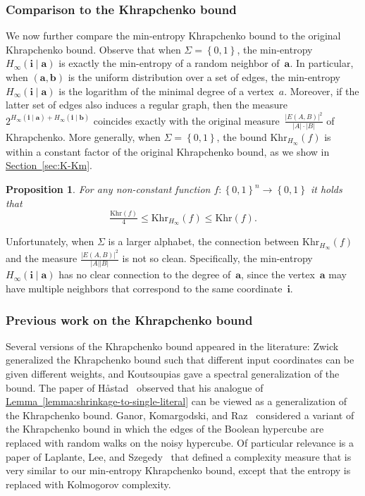 \documentclass[11pt]{article}
\numberwithin{equation}{section}
\newtheorem{proposition}[theorem]{Proposition}
\theoremstyle{definition}
\theoremstyle{plain}
\newcommand{\expref}[2]{\hyperref[#2]{#1~\ref{#2}}}
\theoremstyle{definition}\newtheorem{notation}[theorem]{Notation}\theoremstyle{plain}
\newcommand{\B}{\left\{ 0,1 \right \}}
\renewcommand{\a}{\boldsymbol{a}}
\renewcommand{\b}{\boldsymbol{b}}
\renewcommand{\i}{\boldsymbol{i}}
\newcommand{\Hm}{H_{\infty}}
\newcommand{\K}{\mathrm{Khr}}
\newcommand{\Km}{\K_{\Hm}}
\theoremstyle{definition}
\theoremstyle{plain}
\begin{document}
%
\subsubsection{Comparison to the Khrapchenko bound}  %

We now further compare the min-entropy 
Khrap\-chen\-ko %
bound to the original
Khrapchenko bound. Observe that when $\Sigma=\B$, the min-entropy
$\Hm(\i\mid\a)$ is exactly the min-entropy of a random neighbor of~$\a$.
In particular, when $(\a,\b)$ is the uniform distribution over a
set of edges, the min-entropy $\Hm(\i\mid\a)$ is the logarithm of
the minimal degree of a vertex~$a$. Moreover, if the latter set
of edges also induces a regular graph, then the measure $2^{\Hm(\i\mid\a)+\Hm(\i\mid\b)}$
coincides exactly with the original measure~$\frac{\left|E(A,B)\right|^{2}}{\left|A\right|\cdot\left|B\right|}$
of Khrapchenko. More generally, when $\Sigma=\B$, the bound $\Km(f)$
is within a constant factor of the original Khrapchenko bound, as
we show in \expref{Section}{sec:K-Km}. 
\begin{proposition}
\label{prop:K-Km}For any non-constant function $f\colon\B^{n}\to\B$ it
holds that 
\[
\tfrac{\K(f)}{4}\le\Km(f)\le\K(f).
\]
 
\end{proposition}

Unfortunately, when $\Sigma$ is a larger alphabet, the connection
between $\Km(f)$ and the measure $\frac{\left|E(A,B)\right|^{2}}{\left|A\right|\left|B\right|}$
is not so clean. Specifically, the min-entropy $\Hm(\i\mid\a)$ has
no clear connection to the degree of~$\a$, since the vertex~$\a$
may have multiple neighbors that correspond to the same coordinate~$\i$.

%
\subsubsection{Previous work on the Khrapchenko bound}  %

Several versions of the Khrapchenko bound appeared in the literature:
Zwick~\cite{Z91} generalized the Khrapchenko bound such that different
input coordinates can be given different weights, and Koutsoupias
\cite{K93} gave a spectral generalization of the bound. The paper
of H{\aa}stad~\cite{H98} observed that his analogue of 
\expref{Lemma}{lemma:shrinkage-to-single-literal}
can be viewed as a generalization of the Khrapchenko bound. Ganor,
Komargodski, and Raz~\cite{GKR12} considered a variant of the Khrapchenko
bound in which the edges of the Boolean hypercube are replaced with
random walks on the noisy hypercube. Of particular relevance is a
paper of Laplante, Lee, and Szegedy~\cite{LLS06} that defined a
complexity measure that is very similar to our min-entropy Khrapchenko
bound, except that the entropy is replaced with Kolmogorov complexity.
\end{document}
